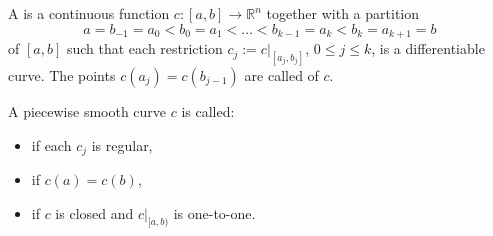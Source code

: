 A  is a continuous function $c: [a, b] \to \mathbb{R}^n$ together with a partition
$$a = b_{-1} = a_0 < b_0 = a_1 < \ldots < b_{k-1} = a_k < b_k = a_{k+1} = b$$
of $[a, b]$ such that each restriction $c_j := c|_{[a_j, b_j]}$, $0 \leq j \leq k$, is a differentiable curve. The points $c(a_j) = c(b_{j-1})$ are called  of $c$.

A piecewise smooth curve $c$ is called:
\begin{itemize}
\item {} if each $c_j$ is regular,
\item {} if $c(a) = c(b)$,
\item {} if $c$ is closed and $c|_{[a,b)}$ is one-to-one.
\end{itemize}
